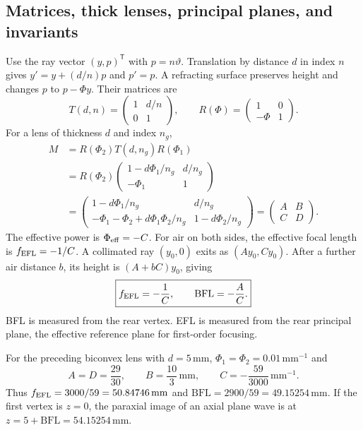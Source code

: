 \documentclass[11pt,a4paper]{article}
\numberwithin{equation}{section}
\newcommand{\mm}{\,\mathrm{mm}}
\begin{document}
\subsection{Matrices, thick lenses, principal planes, and invariants}
Use the ray vector $(y,p)^{\mathsf T}$ with $p=n\vartheta$.
Translation by distance $d$ in index $n$ gives
$y'=y+(d/n)p$ and $p'=p$. A refracting surface preserves height and
changes $p$ to $p-\Phi y$. Their matrices are
\begin{equation}
 T(d,n)=\begin{pmatrix}1&d/n\\0&1\end{pmatrix},\qquad
 R(\Phi)=\begin{pmatrix}1&0\\-\Phi&1\end{pmatrix}.
\end{equation}
For a lens of thickness $d$ and index $n_g$,
\begin{align}
 M&=R(\Phi_2)T(d,n_g)R(\Phi_1)\\
 &=R(\Phi_2)
 \begin{pmatrix}1-d\Phi_1/n_g&d/n_g\\-\Phi_1&1\end{pmatrix}\\
 &=\begin{pmatrix}
 1-d\Phi_1/n_g&d/n_g\\
 -\Phi_1-\Phi_2+d\Phi_1\Phi_2/n_g&1-d\Phi_2/n_g
 \end{pmatrix}
 =\begin{pmatrix}A&B\\C&D\end{pmatrix}.
\end{align}
The effective power is $\Phi_{\rm eff}=-C$.
For air on both sides, the effective focal length is
$f_{\rm EFL}=-1/C$. A collimated ray $(y_0,0)$ exits as
$(Ay_0,Cy_0)$. After a further air distance $b$, its height is
$(A+bC)y_0$, giving
\begin{equation}
 \boxed{f_{\rm EFL}=-\frac1C,\qquad \mathrm{BFL}=-\frac AC.}
\end{equation}
BFL is measured from the rear vertex. EFL is measured from the rear
principal plane, the effective reference plane for first-order focusing.

For the preceding biconvex lens with $d=5\mm$,
$\Phi_1=\Phi_2=0.01\,\mathrm{mm}^{-1}$ and
\[
 A=D=\frac{29}{30},\qquad B=\frac{10}{3}\mm,\qquad
 C=-\frac{59}{3000}\,\mathrm{mm}^{-1}.
\]
Thus $f_{\rm EFL}=3000/59=50.84746\mm$ and
$\mathrm{BFL}=2900/59=49.15254\mm$.
If the first vertex is $z=0$, the paraxial image of an axial plane wave is
at $z=5+\mathrm{BFL}=54.15254\mm$.
\end{document}
